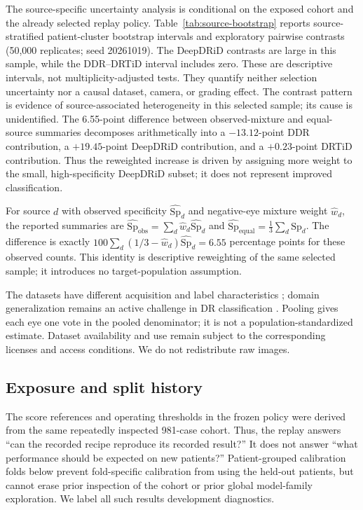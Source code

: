\documentclass[11pt]{article}
\begin{document}
The source-specific uncertainty analysis is conditional on the exposed cohort and the already selected replay policy. Table~\ref{tab:source-bootstrap} reports source-stratified patient-cluster bootstrap intervals and exploratory pairwise contrasts (50,000 replicates; seed 20261019). The DeepDRiD contrasts are large in this sample, while the DDR--DRTiD interval includes zero. These are descriptive intervals, not multiplicity-adjusted tests. They quantify neither selection uncertainty nor a causal dataset, camera, or grading effect. The contrast pattern is evidence of source-associated heterogeneity in this selected sample; its cause is unidentified. The 6.55-point difference between observed-mixture and equal-source summaries decomposes arithmetically into a $-13.12$-point DDR contribution, a $+19.45$-point DeepDRiD contribution, and a $+0.23$-point DRTiD contribution. Thus the reweighted increase is driven by assigning more weight to the small, high-specificity DeepDRiD subset; it does not represent improved classification.

For source $d$ with observed specificity $\widehat{\mathrm{Sp}}_d$ and negative-eye mixture weight $\widehat{w}_d$, the reported summaries are $\widehat{\mathrm{Sp}}_{\mathrm{obs}}=\sum_d\widehat{w}_d\widehat{\mathrm{Sp}}_d$ and $\widehat{\mathrm{Sp}}_{\mathrm{equal}}=\frac{1}{3}\sum_d\widehat{\mathrm{Sp}}_d$. The difference is exactly $100\sum_d(1/3-\widehat{w}_d)\widehat{\mathrm{Sp}}_d=6.55$ percentage points for these observed counts. This identity is descriptive reweighting of the same selected sample; it introduces no target-population assumption.

The datasets have different acquisition and label characteristics \cite{ddr,deepdrid,drtidpaper}; domain generalization remains an active challenge in DR classification \cite{galappaththige2024}. Pooling gives each eye one vote in the pooled denominator; it is not a population-standardized estimate. Dataset availability and use remain subject to the corresponding licenses and access conditions. We do not redistribute raw images.

\subsection{Exposure and split history}
The score references and operating thresholds in the frozen policy were derived from the same repeatedly inspected 981-case cohort. Thus, the replay answers ``can the recorded recipe reproduce its recorded result?'' It does not answer ``what performance should be expected on new patients?'' Patient-grouped calibration folds below prevent fold-specific calibration from using the held-out patients, but cannot erase prior inspection of the cohort or prior global model-family exploration. We label all such results development diagnostics.
\end{document}
